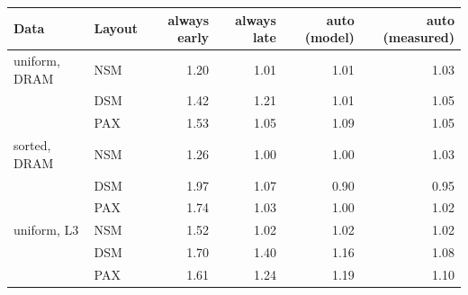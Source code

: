\begin{tabular}{llrrrr}
\toprule
Data & Layout & always early & always late & auto (model) & auto (measured) \\
\midrule
uniform, DRAM & NSM & 1.20 & 1.01 & 1.01 & 1.03 \\
 & DSM & 1.42 & 1.21 & 1.01 & 1.05 \\
 & PAX & 1.53 & 1.05 & 1.09 & 1.05 \\
\midrule
sorted, DRAM & NSM & 1.26 & 1.00 & 1.00 & 1.03 \\
 & DSM & 1.97 & 1.07 & 0.90 & 0.95 \\
 & PAX & 1.74 & 1.03 & 1.00 & 1.02 \\
\midrule
uniform, L3 & NSM & 1.52 & 1.02 & 1.02 & 1.02 \\
 & DSM & 1.70 & 1.40 & 1.16 & 1.08 \\
 & PAX & 1.61 & 1.24 & 1.19 & 1.10 \\
\bottomrule
\end{tabular}
